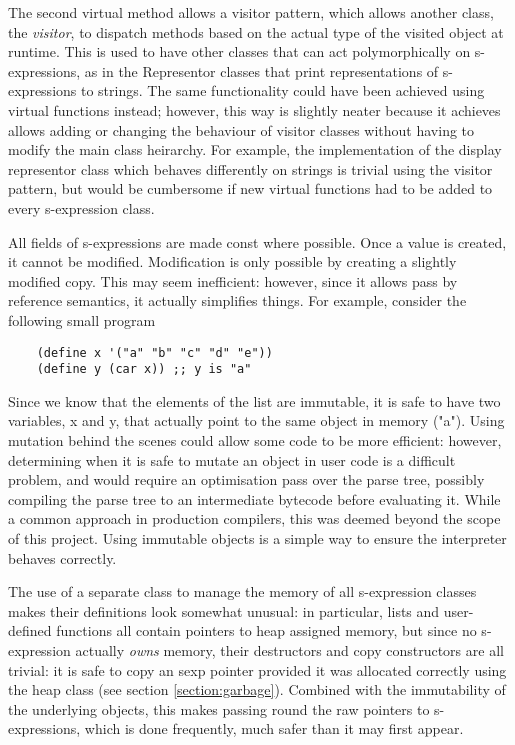 \documentclass[12pt]{article}
\begin{document}
The second virtual method allows a visitor pattern, which allows
another class, the \textit{visitor}, to dispatch methods based on the
actual type of the visited object at runtime. This is used to have
other classes that can act polymorphically on s-expressions, as in the
Representor classes that print representations of s-expressions to
strings. The same functionality could have been achieved using virtual
functions instead; however, this way is slightly neater because it
achieves allows adding or changing the behaviour of visitor classes
without having to modify the main class heirarchy. For example, the
implementation of the display representor class which behaves
differently on strings is trivial using the visitor pattern, but would
be cumbersome if new virtual functions had to be added to every
s-expression class.



All fields of s-expressions are made const where possible. Once a
value is created, it cannot be modified. Modification is only possible
by creating a slightly modified copy. This may seem inefficient:
however, since it allows pass by reference semantics, it actually
simplifies things. For example, consider the following small program


\begin{lstlisting}
	(define x '("a" "b" "c" "d" "e"))
	(define y (car x)) ;; y is "a" 
\end{lstlisting}

Since we know that the elements of the list are immutable, it is safe
to have two variables, x and y, that actually point to the same object
in memory ("a"). Using mutation behind the scenes could allow some
code to be more efficient: however, determining when it is safe to
mutate an object in user code is a difficult problem, and would
require an optimisation pass over the parse tree, possibly compiling
the parse tree to an intermediate bytecode before evaluating it. While
a common approach in production compilers, this was deemed beyond the
scope of this project. Using immutable objects is a simple way to ensure
the interpreter behaves correctly.

The use of a separate class to manage the memory of all s-expression
classes makes their definitions look somewhat unusual: in particular,
lists and user-defined functions all contain pointers to heap assigned
memory, but since no s-expression actually \textit{owns} memory, their
destructors and copy constructors are all trivial: it is safe to copy
an sexp pointer provided it was allocated correctly using the heap
class (see section \ref{section:garbage}). Combined with the
immutability of the underlying objects, this makes passing round the
raw pointers to s-expressions, which is done frequently,
much safer than it may first appear.
\end{document}

